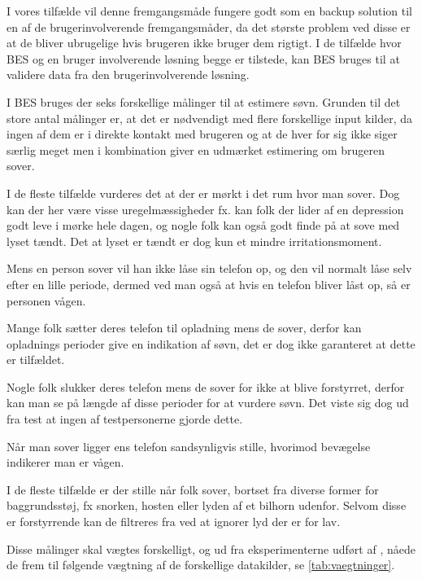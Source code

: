 I vores tilfælde vil denne fremgangsmåde fungere godt som en backup solution til en af de brugerinvolverende fremgangsmåder, da det største problem ved disse er at de bliver ubrugelige hvis brugeren ikke bruger dem rigtigt.
I de tilfælde hvor BES og en bruger involverende løsning begge er tilstede, kan BES bruges til at validere data fra den brugerinvolverende løsning. 

I BES bruges der seks forskellige målinger til at estimere søvn.
Grunden til det store antal målinger er, at det er nødvendigt med flere forskellige input kilder, da ingen af dem er i direkte kontakt med brugeren og at de hver for sig ikke siger særlig meget men i kombination giver en udmærket estimering om brugeren sover.
\begin{description}[style=nextline]
\item[Lys]
I de fleste tilfælde vurderes det at der er mørkt i det rum hvor man sover. Dog kan der her være visse uregelmæssigheder fx. kan folk der lider af en depression godt leve i mørke hele dagen, og nogle folk kan også godt finde på at sove med lyset tændt. Det at lyset er tændt er dog kun et mindre irritationsmoment.
\item[Lås]
Mens en person sover vil han ikke låse sin telefon op, og den vil normalt låse selv efter en lille periode, dermed ved man også at hvis en telefon bliver låst op, så er personen vågen.
\item[Opladning]
Mange folk sætter deres telefon til opladning mens de sover, derfor kan opladnings perioder give en indikation af søvn, det er dog ikke garanteret at dette er tilfældet.
\item[Slukket]
Nogle folk slukker deres telefon mens de sover for ikke at blive forstyrret, derfor kan man se på længde af disse perioder for at vurdere søvn. Det viste sig dog ud fra test at ingen af testpersonerne gjorde dette. 
\item[Bevægelse]
Når man sover ligger ens telefon sandsynligvis stille, hvorimod bevægelse indikerer man er vågen.
\item[Lyd]
I de fleste tilfælde er der stille når folk sover, bortset fra diverse former for baggrundsstøj, fx snorken, hosten eller lyden af et bilhorn udenfor. Selvom disse er forstyrrende kan de filtreres fra ved at ignorer lyd der er for lav.
\end{description}
 
Disse målinger skal vægtes forskelligt, og ud fra eksperimenterne udført af \citet{6563918}, nåede de frem til følgende vægtning af de forskellige datakilder, se \cref{tab:vaegtninger}.


